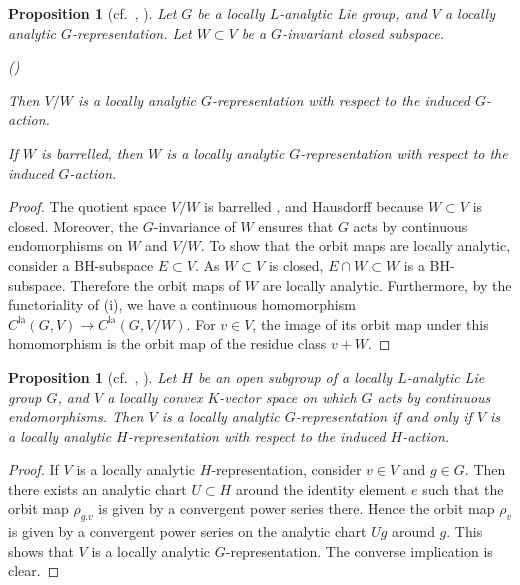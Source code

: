 \documentclass[a4paper, reqno, 10pt]{amsart}
\newtheorem{proposition}[theorem]{Proposition}
\theoremstyle{definition}
\newenvironment{altenumerate}
	{\begin{list}
		{\textup{(\theenumi)} }
		{\usecounter{enumi}
			\setlength{\labelwidth}{0pt}
			\setlength{\labelsep}{0pt}
			\setlength{\leftmargin}{0pt}
			\setlength{\itemsep}{0pt}
			\setlength{\topsep}{0pt}
		\renewcommand{\theenumi}{\roman{enumi}}
		}}
	{\end{list}}
\numberwithin{equation}{section}
\newcommand{\la}{{\mathrm{la}}}
\newcommand{\ra}{\rightarrow}
\begin{document}
\begin{proposition}[{cf.\ \cite[Satz 3.1.7]{FeauxdeLacroix99TopDarstpAdischLieGrp}, \cite[Prop.\ 3.6.14]{Emerton17LocAnVect}}]\label{Prop 1 - Subrepresentations and quotientrepresentations of locally analytic representations}
	Let $G$ be a locally $L$-analytic Lie group, and $V$ a locally analytic $G$-representation.
	Let $W\subset V$ be a $G$-invariant closed subspace.
	\begin{altenumerate}
		\item
		Then $V/W$ is a locally analytic $G$-representation with respect to the induced $G$-action.
		\item
		If $W$ is barrelled, then $W$ is a locally analytic $G$-representation with respect to the induced $G$-action.	
	\end{altenumerate}
\end{proposition}
\begin{proof}
	The quotient space $V/W$ is barrelled \cite[Expl.\ 4) after Cor.\ 6.16]{Schneider02NonArchFunctAna}, and Hausdorff because $W\subset V$ is closed.
	Moreover, the $G$-invariance of $W$ ensures that $G$ acts by continuous endomorphisms on $W$ and $V/W$.
	To show that the orbit maps are locally analytic, consider a BH-subspace $E\subset V$.
	As $W\subset V$ is closed, $E\cap W \subset W$ is a BH-subspace.
	Therefore the orbit maps of $W$ are locally analytic.
	Furthermore, by the functoriality of  (i), we have a continuous homomorphism $C^\la(G,V) \ra C^\la(G,V/W)$.
	For $v\in V$, the image of its orbit map under this homomorphism is the orbit map of the residue class $v+W$.	
\end{proof}



\begin{proposition}[{cf.\ \cite[Lemma 3.2.4]{FeauxdeLacroix99TopDarstpAdischLieGrp}, \cite[Prop. 3.6.11]{Emerton17LocAnVect}}]\label{Prop 1 - Locally analytic representations and open subgroups}
	Let $H$ be an open subgroup of a locally $L$-analytic Lie group $G$, and $V$ a locally convex $K$-vector space on which $G$ acts by continuous endomorphisms.
	Then $V$ is a locally analytic $G$-representation if and only if $V$ is a locally analytic $H$-representation with respect to the induced $H$-action.
\end{proposition}
\begin{proof}
	If $V$ is a locally analytic $H$-representation, consider $v\in V$ and $g\in G$.
	Then there exists an analytic chart $U\subset H$ around the identity element $e$ such that the orbit map $\rho_{g.v}$ is given by a convergent power series there.
	Hence the orbit map $\rho_v$ is given by a convergent power series on the analytic chart $Ug$ around $g$.
	This shows that $V$ is a locally analytic $G$-representation.
	The converse implication is clear.
\end{proof}
\end{document}

